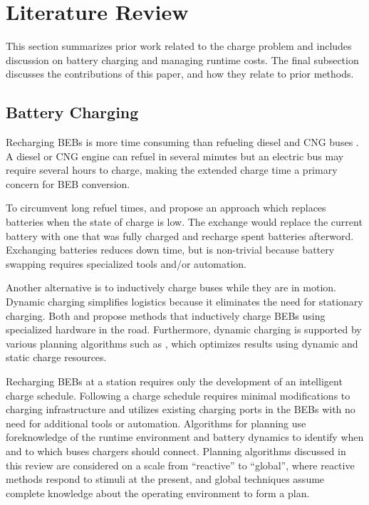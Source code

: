 \section{Literature Review}
\par This section summarizes prior work related to the charge problem and includes discussion on battery charging and managing runtime costs. The final subsection discusses the contributions of this paper, and how they relate to prior methods.
\subsection{Battery Charging}
Recharging BEBs is more time consuming than refueling diesel and CNG buses \cite{wei_optimizing_2018}. A diesel or CNG engine can refuel in several minutes but an electric bus may require several hours to charge, making the extended charge time a primary concern for BEB conversion.
\par To circumvent long refuel times, \cite{xian_zhang_optimal_2016} and \cite{jain_battery_2020} propose an approach which replaces batteries when the state of charge is low. The exchange would replace the current battery with one that was fully charged and recharge spent batteries afterword. Exchanging batteries reduces down time, but is non-trivial because battery swapping requires specialized tools and/or automation.
\par Another alternative is to inductively charge buses while they are in motion. Dynamic charging simplifies logistics because it eliminates the need for stationary charging. Both \cite{balde_electric_2019} and \cite{jeong_automatic_2018} propose methods that inductively charge BEBs using specialized hardware in the road. Furthermore, dynamic charging is supported by various planning algorithms such as \cite{csonka_optimization_2021}, which optimizes results using dynamic and static charge resources. 
\par Recharging BEBs at a station %
requires only the development of an intelligent charge schedule. Following a charge schedule requires minimal modifications to charging infrastructure and utilizes existing charging ports in the BEBs with no need for additional tools or automation. Algorithms for planning use foreknowledge of the runtime environment and battery dynamics to identify when and to which buses chargers should connect. Planning algorithms discussed in this review are considered on a scale from ``reactive'' to ``global'', where reactive methods respond to stimuli at the present, and global techniques assume complete knowledge about the operating environment to form a plan.
